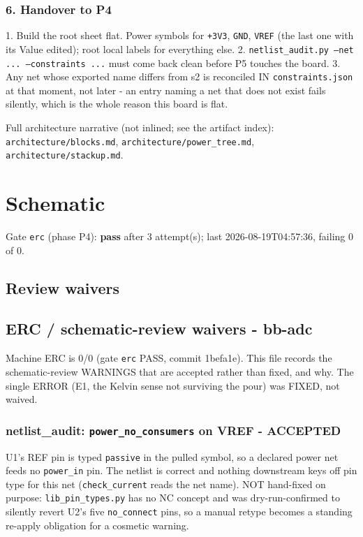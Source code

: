 \documentclass[11pt,a4paper]{article}
\begin{document}
\subsubsection*{6. Handover to P4}
1. Build the root sheet flat. Power symbols for \texttt{+3V3}, \texttt{GND}, \texttt{VREF} (the last one with its Value edited); root local labels for everything else. 2. \texttt{netlist\_audit.py --net ... --constraints ...} must come back clean before P5 touches the board. 3. Any net whose exported name differs from s2 is reconciled IN \texttt{constraints.json} at that moment, not later - an entry naming a net that does not exist fails silently, which is the whole reason this board is flat.

Full architecture narrative (not inlined; see the artifact index): \texttt{architecture/blocks.md}, \texttt{architecture/power\_tree.md}, \texttt{architecture/stackup.md}.
\section{Schematic}
Gate \texttt{erc} (phase P4): \textbf{pass} after 3 attempt(s); last 2026-08-19T04:57:36, failing 0 of 0.
\subsection*{Review waivers}
\subsection*{ERC / schematic-review waivers - bb-adc}
Machine ERC is 0/0 (gate \texttt{erc} PASS, commit 1befa1e). This file records the schematic-review WARNINGS that are accepted rather than fixed, and why. The single ERROR (E1, the Kelvin sense not surviving the pour) was FIXED, not waived.

\subsubsection*{netlist\_audit: \texttt{power\_no\_consumers} on VREF - ACCEPTED}
U1's REF pin is typed \texttt{passive} in the pulled symbol, so a declared power net feeds no \texttt{power\_in} pin. The netlist is correct and nothing downstream keys off pin type for this net (\texttt{check\_current} reads the net name). NOT hand-fixed on purpose: \texttt{lib\_pin\_types.py} has no NC concept and was dry-run-confirmed to silently revert U2's five \texttt{no\_connect} pins, so a manual retype becomes a standing re-apply obligation for a cosmetic warning.
\end{document}
